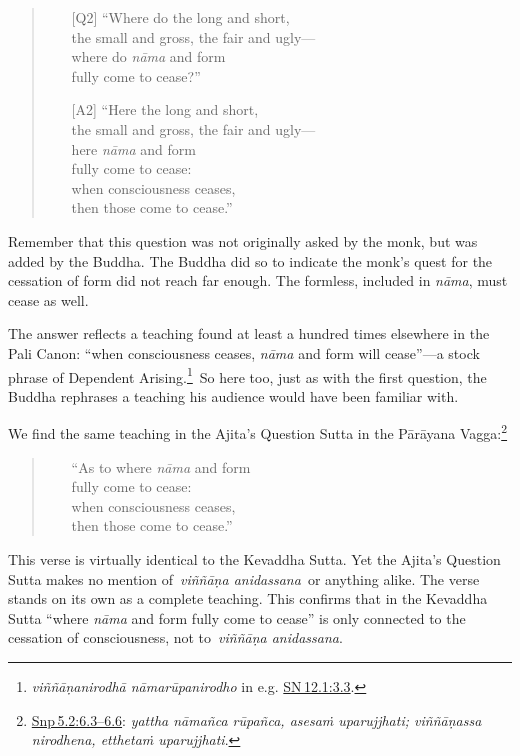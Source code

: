 \documentclass[10pt, openany]{book}
\begin{document}
\begin{quote}


\begin{itemize}

\item[{[Q2]}]“Where do the long and short, \\ the small and gross, the fair and ugly— \\ where do \textit{nāma} and form \\ fully come to cease?”


\item[{[A2]}]“Here the long and short, \\ the small and gross, the fair and ugly— \\ here \textit{nāma} and form \\ fully come to cease: \\ when consciousness ceases, \\ then those come to cease.”

\end{itemize}

\end{quote}
Remember that this question was not originally asked by the monk, but was added by the Buddha. The Buddha did so to indicate the monk’s quest for the cessation of form did not reach far enough. The formless, included in \textit{nāma}, must cease as well.


The answer reflects a teaching found at least a hundred times elsewhere in the Pali Canon: “when consciousness ceases, \textit{nāma} and form will cease”—a stock phrase of Dependent Arising.\footnote {\textit{viññāṇanirodhā nāmarūpanirodho} in e.g. \href{https://suttacentral.net/sn12.1/en/sujato\#3.3}{SN 12.1:3.3}.} So here too, just as with the first question, the Buddha rephrases a teaching his audience would have been familiar with.


We find the same teaching in the Ajita’s Question Sutta in the Pārāyana Vagga:\footnote {\href{https://suttacentral.net/snp5.2/en/sujato\#6.3}{Snp 5.2:6.3–6.6}: \textit{yattha nāmañca rūpañca, asesaṁ uparujjhati; viññāṇassa nirodhena, etthetaṁ uparujjhati}.}


\begin{quote}


\begin{itemize}

\item[{}]“As to where \textit{nāma} and form \\ fully come to cease: \\ when consciousness ceases, \\ then those come to cease.”

\end{itemize}

\end{quote}
This verse is virtually identical to the Kevaddha Sutta. Yet the Ajita’s Question Sutta makes no mention of \textit{viññāṇa anidassana} or anything alike. The verse stands on its own as a complete teaching. This confirms that in the Kevaddha Sutta “where \textit{nāma} and form fully come to cease” is only connected to the cessation of consciousness, not to \textit{viññāṇa anidassana}.
\end{document}
